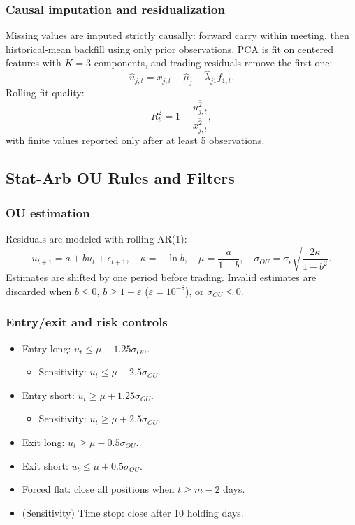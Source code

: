 \subsubsection*{Causal imputation and residualization}
Missing values are imputed strictly causally: forward carry within meeting, then
historical-mean backfill using only prior observations. PCA is fit on centered
features with $K=3$ components, and trading residuals remove the first one:
\[
\hat{u}_{j,t}=x_{j,t}-\hat{\mu}_j-\hat{\lambda}_{j1}f_{1,t}.
\]
Rolling fit quality:
\[
R_t^2=1-\frac{\overline{u_{j,t}^2}}{\overline{x_{j,t}^2}},
\]
with finite values reported only after at least 5 observations.

\subsection{Stat-Arb OU Rules and Filters}
\label{app:statarb_ou_rules}

\subsubsection*{OU estimation}
Residuals are modeled with rolling AR(1):
\[
u_{t+1}=a+b u_t+\epsilon_{t+1},\quad
\kappa=-\ln b,\quad
\mu=\frac{a}{1-b},\quad
\sigma_{OU}=\sigma_{\epsilon}\sqrt{\frac{2\kappa}{1-b^2}}.
\]
Estimates are shifted by one period before trading. Invalid estimates are
discarded when $b\le0$, $b\ge1-\varepsilon$ ($\varepsilon=10^{-8}$), or
$\sigma_{OU}\le0$.

\subsubsection*{Entry/exit and risk controls}
\begin{itemize}
    \item Entry long: $u_t \le \mu-1.25\sigma_{OU}$.
    \begin{itemize}
    \item Sensitivity: $u_t \le \mu-2.5\sigma_{OU}$.
    \end{itemize}
    \item Entry short: $u_t \ge \mu+1.25\sigma_{OU}$.
    \begin{itemize}
    \item Sensitivity: $u_t \ge \mu+2.5\sigma_{OU}$.
    \end{itemize}
    \item Exit long: $u_t \ge \mu-0.5\sigma_{OU}$.
    \item Exit short: $u_t \le \mu+0.5\sigma_{OU}$.
    \item Forced flat: close all positions when $t \ge m-2$ days.
    \item (Sensitivity) Time stop: close after 10 holding days.
\end{itemize}

